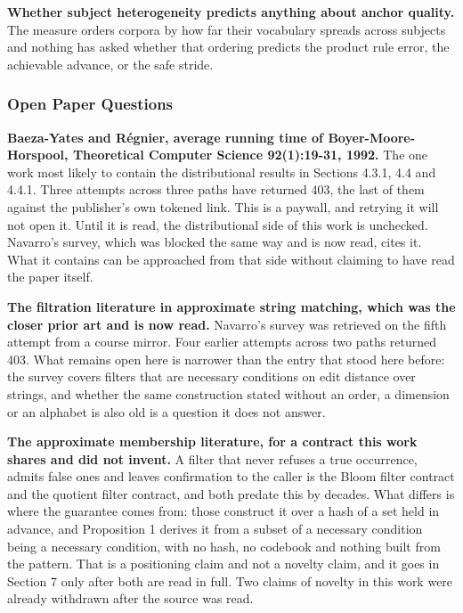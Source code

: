 \textbf{Whether subject heterogeneity predicts anything about anchor quality.} The measure orders corpora by how far their vocabulary spreads across subjects and nothing has asked whether that ordering predicts the product rule error, the achievable advance, or the safe stride.

\subsubsection{Open Paper Questions}

\textbf{Baeza-Yates and Régnier, average running time of Boyer-Moore-Horspool, Theoretical Computer Science 92(1):19-31, 1992.} The one work most likely to contain the distributional results in Sections 4.3.1, 4.4 and 4.4.1. Three attempts across three paths have returned 403, the last of them against the publisher's own tokened link. This is a paywall, and retrying it will not open it. Until it is read, the distributional side of this work is unchecked. Navarro's survey, which was blocked the same way and is now read, cites it. What it contains can be approached from that side without claiming to have read the paper itself.

\textbf{The filtration literature in approximate string matching, which was the closer prior art and is now read.} Navarro's survey was retrieved on the fifth attempt from a course mirror. Four earlier attempts across two paths returned 403. What remains open here is narrower than the entry that stood here before: the survey covers filters that are necessary conditions on edit distance over strings, and whether the same construction stated without an order, a dimension or an alphabet is also old is a question it does not answer.

\textbf{The approximate membership literature, for a contract this work shares and did not invent.} A filter that never refuses a true occurrence, admits false ones and leaves confirmation to the caller is the Bloom filter contract and the quotient filter contract, and both predate this by decades. What differs is where the guarantee comes from: those construct it over a hash of a set held in advance, and Proposition 1 derives it from a subset of a necessary condition being a necessary condition, with no hash, no codebook and nothing built from the pattern. That is a positioning claim and not a novelty claim, and it goes in Section 7 only after both are read in full. Two claims of novelty in this work were already withdrawn after the source was read.

